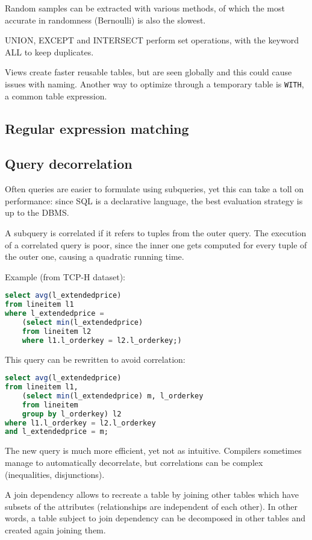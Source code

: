Random samples can be extracted with various methods, of which the most accurate in randomness (Bernoulli) is also the slowest.

UNION, EXCEPT and INTERSECT perform set operations, with the keyword ALL to keep duplicates.

Views create faster reusable tables, but are seen globally and this could cause issues with naming. Another way to optimize through a temporary table is \texttt{WITH}, a common table expression.

\subsection{Regular expression matching}


\subsection{Query decorrelation}
Often queries are easier to formulate using subqueries, yet this can take a toll on performance: since SQL is a declarative language, the best evaluation strategy is up to the DBMS.

A subquery is correlated if it refers to tuples from the outer query. The execution of a correlated query is poor, since the inner one gets computed for every tuple of the outer one, causing a quadratic running time.

Example (from TCP-H dataset):
\begin{lstlisting}[language=SQL]
select avg(l_extendedprice)
from lineitem l1
where l_extendedprice =
	(select min(l_extendedprice)
	from lineitem l2
	where l1.l_orderkey = l2.l_orderkey;)
\end{lstlisting}

This query can be rewritten to avoid correlation:
\begin{lstlisting}[language=SQL]
select avg(l_extendedprice)
from lineitem l1,
	(select min(l_extendedprice) m, l_orderkey
	from lineitem
	group by l_orderkey) l2
where l1.l_orderkey = l2.l_orderkey
and l_extendedprice = m;
\end{lstlisting}

The new query is much more efficient, yet not as intuitive. Compilers sometimes manage to automatically decorrelate, but correlations can be complex (inequalities, disjunctions).

A join dependency allows to recreate a table by joining other tables which have subsets of the attributes (relationships are independent of each other). In other words, a table subject to join dependency can be decomposed in other tables and created again joining them.

